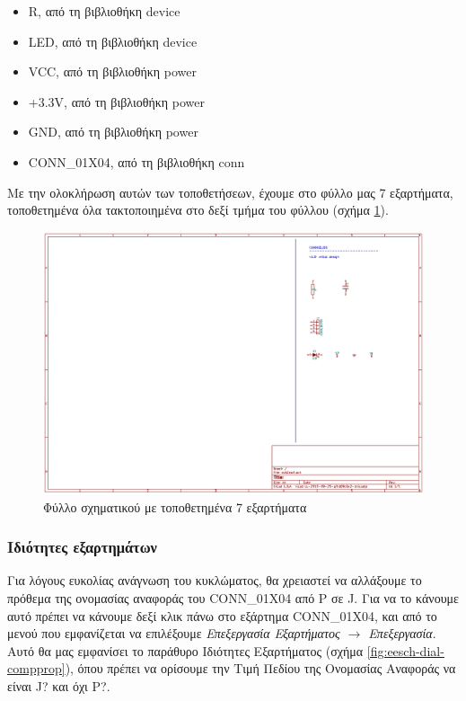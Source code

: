 \documentclass[a4paper]{article}
\begin{document}
\begin{itemize}
    \item R, από τη βιβλιοθήκη device
    \item LED, από τη βιβλιοθήκη device
    \item VCC, από τη βιβλιοθήκη power
    \item +3.3V, από τη βιβλιοθήκη power
    \item GND, από τη βιβλιοθήκη power
    \item CONN\_01X04, από τη βιβλιοθήκη conn
\end{itemize}

Με την ολοκλήρωση αυτών των τοποθετήσεων, έχουμε στο φύλλο μας 7 εξαρτήματα, τοποθετημένα όλα τακτοποιημένα στο δεξί τμήμα του φύλλου (σχήμα \ref{fig:eesch-circ-placedccomp}).

\begin{figure}
  \begin{center}
    \includegraphics[width=.9\textwidth]{img/eesch-circ-placedccomp.png}
    \caption{Φύλλο σχηματικού με τοποθετημένα 7 εξαρτήματα}
    \label{fig:eesch-circ-placedccomp}
  \end{center}
\end{figure}

\subsubsection{Ιδιότητες εξαρτημάτων}

Για λόγους ευκολίας ανάγνωση του κυκλώματος, θα χρειαστεί να αλλάξουμε το πρόθεμα της ονομασίας αναφοράς του CONN\_01X04 από P σε J. Για να το κάνουμε αυτό πρέπει να κάνουμε δεξί κλικ πάνω στο εξάρτημα CONN\_01X04, και από το μενού που εμφανίζεται να επιλέξουμε \textit{Επεξεργασία Εξαρτήματος $\rightarrow$ Επεξεργασία}. Αυτό θα μας εμφανίσει το παράθυρο Ιδιότητες Εξαρτήματος (σχήμα \ref{fig:eesch-dial-compprop}), όπου πρέπει να ορίσουμε την Τιμή Πεδίου της Ονομασίας Αναφοράς να είναι J? και όχι P?.
\end{document}
